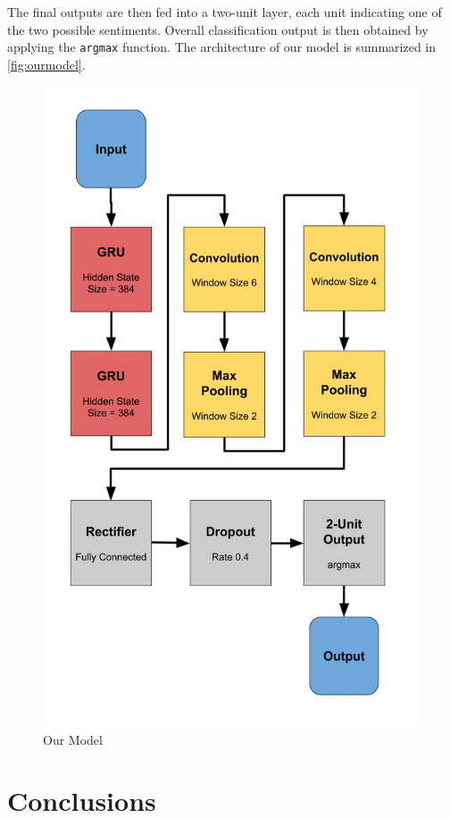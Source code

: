 \documentclass[10pt,conference,compsocconf]{IEEEtran}
\begin{document}
The final outputs are then fed into a two-unit layer, each unit
indicating one of the two possible sentiments. Overall classification
output is then obtained by applying the \texttt{argmax} function.
The architecture of our model is summarized in \autoref{fig:ourmodel}.

\begin{figure}[h!]
  \centering
  \includegraphics[scale=0.35]{our_model_architecture.png}
  \caption{Our Model}
  \label{fig:ourmodel}
\end{figure}

\section*{Conclusions}
\end{document}
